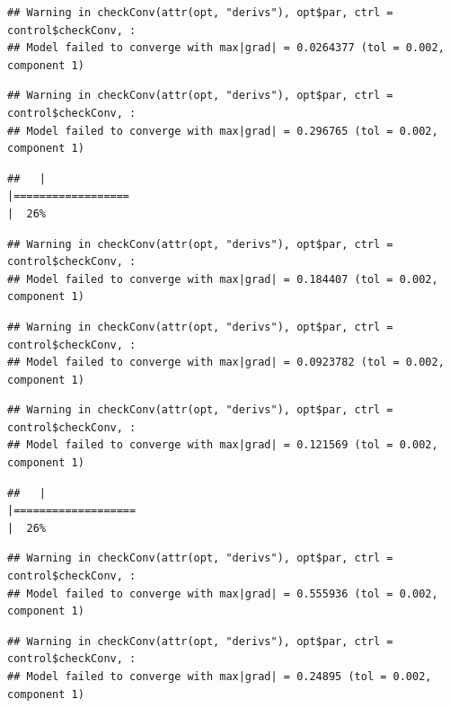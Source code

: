 \documentclass[
  12pt,
]{book}
\begin{document}
\begin{verbatim}
## Warning in checkConv(attr(opt, "derivs"), opt$par, ctrl = control$checkConv, :
## Model failed to converge with max|grad| = 0.0264377 (tol = 0.002, component 1)
\end{verbatim}

\begin{verbatim}
## Warning in checkConv(attr(opt, "derivs"), opt$par, ctrl = control$checkConv, :
## Model failed to converge with max|grad| = 0.296765 (tol = 0.002, component 1)
\end{verbatim}

\begin{verbatim}
##   |                                                                              |==================                                                    |  26%
\end{verbatim}

\begin{verbatim}
## Warning in checkConv(attr(opt, "derivs"), opt$par, ctrl = control$checkConv, :
## Model failed to converge with max|grad| = 0.184407 (tol = 0.002, component 1)
\end{verbatim}

\begin{verbatim}
## Warning in checkConv(attr(opt, "derivs"), opt$par, ctrl = control$checkConv, :
## Model failed to converge with max|grad| = 0.0923782 (tol = 0.002, component 1)
\end{verbatim}

\begin{verbatim}
## Warning in checkConv(attr(opt, "derivs"), opt$par, ctrl = control$checkConv, :
## Model failed to converge with max|grad| = 0.121569 (tol = 0.002, component 1)
\end{verbatim}

\begin{verbatim}
##   |                                                                              |===================                                                   |  26%
\end{verbatim}

\begin{verbatim}
## Warning in checkConv(attr(opt, "derivs"), opt$par, ctrl = control$checkConv, :
## Model failed to converge with max|grad| = 0.555936 (tol = 0.002, component 1)
\end{verbatim}

\begin{verbatim}
## Warning in checkConv(attr(opt, "derivs"), opt$par, ctrl = control$checkConv, :
## Model failed to converge with max|grad| = 0.24895 (tol = 0.002, component 1)
\end{verbatim}
\end{document}
